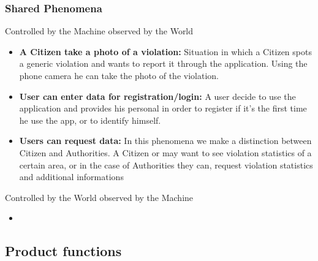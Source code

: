 \documentclass{article}
\begin{document}
\subsubsection{Shared Phenomena}
Controlled by the Machine observed by the World
\begin{itemize}
    \item \textbf{A Citizen take a photo of a violation:}
    Situation in which a Citizen spots a generic violation and wants
    to report it through the application. Using the phone camera he
    can take the photo of the violation.

    \item \textbf{User can enter data for registration/login:}
    A user decide to use the application and provides his personal 
    in order to register if it's the first time he use the app, or to
    identify himself.

    \item \textbf{Users can request data:}
    In this phenomena we make a distinction between Citizen and Authorities.
    A Citizen or may want to see violation statistics 
    of a certain area, or in the case of Authorities they can, request
    violation statistics and additional informations 
\end{itemize}

Controlled by the World observed by the Machine
\begin{itemize}
    \item 
\end{itemize}

\subsection{Product functions}
\subsubsection{}
\end{document}
